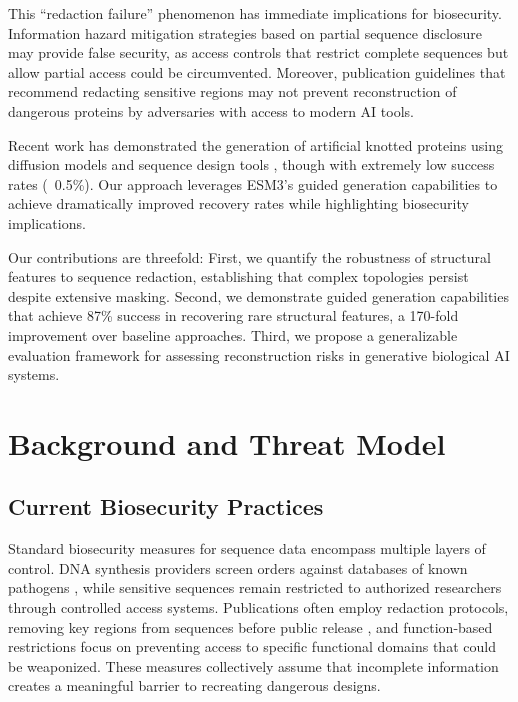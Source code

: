 \documentclass{article}
\begin{document}
This ``redaction failure'' phenomenon has immediate implications for biosecurity. Information hazard mitigation strategies based on partial sequence disclosure may provide false security, as access controls that restrict complete sequences but allow partial access could be circumvented. Moreover, publication guidelines that recommend redacting sensitive regions may not prevent reconstruction of dangerous proteins by adversaries with access to modern AI tools.

Recent work has demonstrated the generation of artificial knotted proteins using diffusion models and sequence design tools \cite{klimentova2024unveiling,watson2023novo,dauparas2022robust,alamdari2023protein}, though with extremely low success rates (~0.5\%). Our approach leverages ESM3's guided generation capabilities to achieve dramatically improved recovery rates while highlighting biosecurity implications.

Our contributions are threefold: First, we quantify the robustness of structural features to sequence redaction, establishing that complex topologies persist despite extensive masking. Second, we demonstrate guided generation capabilities that achieve 87\% success in recovering rare structural features, a 170-fold improvement over baseline approaches. Third, we propose a generalizable evaluation framework for assessing reconstruction risks in generative biological AI systems.

\section{Background and Threat Model}

\subsection{Current Biosecurity Practices}

Standard biosecurity measures for sequence data encompass multiple layers of control. DNA synthesis providers screen orders against databases of known pathogens \cite{igsc2024}, while sensitive sequences remain restricted to authorized researchers through controlled access systems. Publications often employ redaction protocols, removing key regions from sequences before public release \cite{nsabb2007framework,schmidt2009synthetic}, and function-based restrictions focus on preventing access to specific functional domains that could be weaponized. These measures collectively assume that incomplete information creates a meaningful barrier to recreating dangerous designs.
\end{document}
